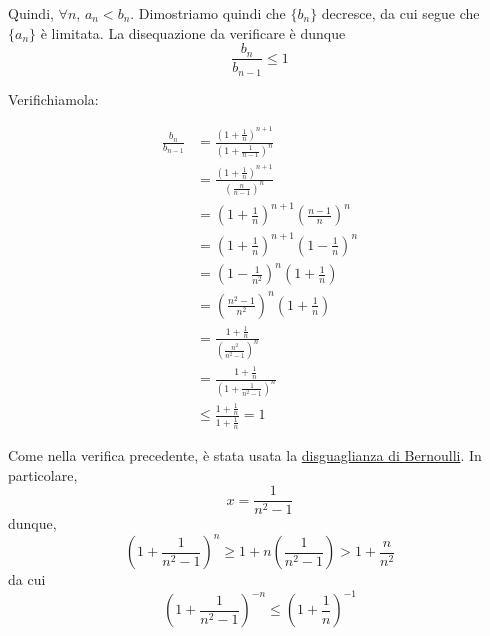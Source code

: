 \documentclass[../../dimostrazioni]{subfiles}
\begin{document}
            Quindi, \(\forall n, \, a_n < b_n\). Dimostriamo quindi che \(\{b_n\}\) decresce, da cui segue che \(\{a_n\}\) è limitata.
            La disequazione da verificare è dunque
            \[
                \frac{b_n}{b_{n - 1}} \leqslant 1
            \]

            Verifichiamola:

            \medskip
            \begin{minipage}[t]{.55\textwidth}
                \vspace{-\baselineskip}
                
                \begin{align*}
                    \frac{b_n}{b_{n - 1}} &= \frac{{\left(1 + \frac{1}{n}\right)}^{n + 1}}{{\left(1 + \frac{1}{n - 1}\right)}^n}\\
                    &= \frac{{\left(1 + \frac{1}{n}\right)}^{n + 1}}{{\left(\frac{n}{n - 1}\right)}^n}\\
                    &= {\left(1 + \frac{1}{n}\right)}^{n + 1} {\left(\frac{n - 1}{n}\right)}^n\\
                    &= {\left(1 + \frac{1}{n}\right)}^{n + 1} {\left(1 - \frac{1}{n}\right)}^n\\
                    &= {\left(1 - \frac{1}{n^2}\right)}^n \left(1 + \frac{1}{n}\right)\\
                    &= {\left(\frac{n^2 - 1}{n^2}\right)}^n \left(1 + \frac{1}{n}\right)\\
                    &= \frac{1 + \frac{1}{n}}{{\left(\frac{n^2}{n^2 - 1}\right)}^n}\\
                    &= \frac{1 + \frac{1}{n}}{{\left(1 + \frac{1}{n^2 - 1}\right)}^n}\\
                    &\leqslant \frac{1 + \frac{1}{n}}{1 + \frac{1}{n}} = 1
                \end{align*}
            \end{minipage}
            \hfill
            \begin{minipage}[t]{.45\textwidth}
                \vspace{-\baselineskip}
                \vspace{15ex}

                \begin{framed}
                    Come nella verifica precedente, è stata usata la
                    \hyperref[disBernoulli]{disguaglianza di Bernoulli}.
                    In particolare,
                    \[
                        x = \frac{1}{n^2 - 1}
                    \]
                    dunque,
                    \[
                        {\left(1 + \frac{1}{n^2 - 1}\right)}^n \geqslant 1 + n \left(\frac{1}{n^2 - 1}\right) > 1 + \frac{n}{n^2}
                    \]
                    da cui
                    \[
                        {\left(1 + \frac{1}{n^2 - 1}\right)}^{-n} \leqslant {\left(1 + \frac{1}{n}\right)}^{-1}
                    \]
                \end{framed}
            \end{minipage}
        
\end{document}

